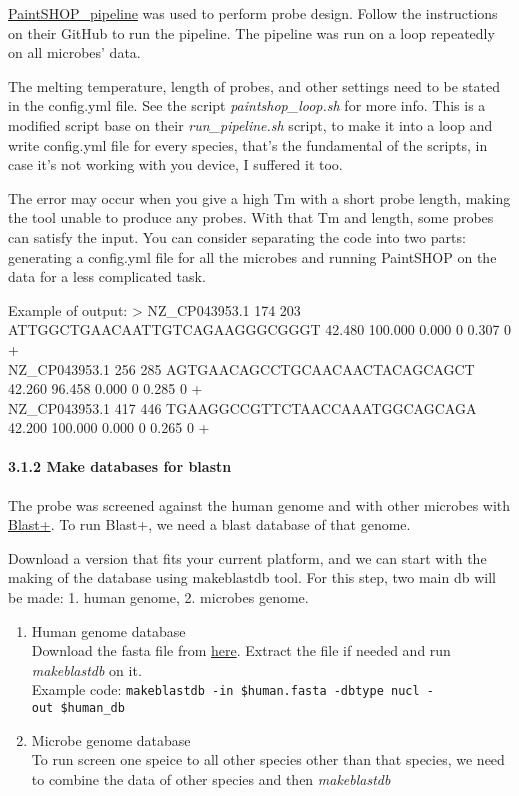 \documentclass[
]{article}
\begin{document}
\href{https://github.com/beliveau-lab/PaintSHOP_pipeline}{PaintSHOP\_pipeline}
was used to perform probe design. Follow the instructions on their
GitHub to run the pipeline. The pipeline was run on a loop repeatedly on
all microbes' data.

The melting temperature, length of probes, and other settings need to be
stated in the config.yml file. See the script \emph{paintshop\_loop.sh}
for more info. This is a modified script base on their
\emph{run\_pipeline.sh} script, to make it into a loop and write
config.yml file for every species, that's the fundamental of the
scripts, in case it's not working with you device, I suffered it too.

The error may occur when you give a high Tm with a short probe length,
making the tool unable to produce any probes. With that Tm and length,
some probes can satisfy the input. You can consider separating the code
into two parts: generating a config.yml file for all the microbes and
running PaintSHOP on the data for a less complicated task.

Example of output: \textgreater{} NZ\_CP043953.1 174 203
ATTGGCTGAACAATTGTCAGAAGGGCGGGT 42.480 100.000 0.000 0 0.307 0 +\\
NZ\_CP043953.1 256 285 AGTGAACAGCCTGCAACAACTACAGCAGCT 42.260 96.458
0.000 0 0.285 0 +\\
NZ\_CP043953.1 417 446 TGAAGGCCGTTCTAACCAAATGGCAGCAGA 42.200 100.000
0.000 0 0.265 0 +

\paragraph{3.1.2 Make databases for
blastn}\label{make-databases-for-blastn}

The probe was screened against the human genome and with other microbes
with
\href{https://blast.ncbi.nlm.nih.gov/doc/blast-help/downloadblastdata.html}{Blast+}.
To run Blast+, we need a blast database of that genome.

Download a version that fits your current platform, and we can start
with the making of the database using makeblastdb tool. For this step,
two main db will be made: 1. human genome, 2. microbes genome.

\begin{enumerate}
\def\labelenumi{\arabic{enumi}.}
\item
  Human genome database\\
  Download the fasta file from
  \href{https://www.ncbi.nlm.nih.gov/genome/guide/human/}{here}. Extract
  the file if needed and run \emph{makeblastdb} on it.\\
  Example code:
  \texttt{makeblastdb\ -in\ \$human.fasta\ -dbtype\ nucl\ -out\ \$human\_db}
\item
  Microbe genome database\\
  To run screen one speice to all other species other than that species,
  we need to combine the data of other species and then
  \emph{makeblastdb}
\end{enumerate}
\end{document}
